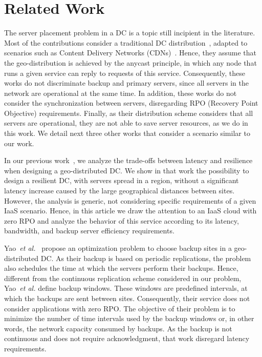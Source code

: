 \documentclass[preprint]{elsarticle}
\begin{document}
\section{Related Work}
\label{zeroRPO:secRelacionados}

The server placement problem in a DC is a topic still incipient in the literature. Most of the contributions consider a traditional DC distribution~\cite{habib2012design,xiaoJoint2014,develder2011survivable,develder2012resilient,xiao2013Data}, adapted to scenarios such as Content Delivery Networks (CDNs)~\cite{pierre2006Globule}. Hence, they assume that the geo-distribution is achieved by the anycast principle, in which any node that runs a given service can reply to requests of this service. Consequently, these works do not discriminate backup and primary servers, since all servers in the network are operational at the same time.
In addition, these works do not consider the synchronization between servers, disregarding RPO (Recovery Point Objective) requirements. Finally, as their distribution scheme considers that all servers are operational,
they are not able to save server resources, as we do in this work. We detail next three other works that consider a scenario similar to our work.

In our previous work~\cite{couto2014Latency}, we analyze the trade-offs between latency and resilience when designing a geo-distributed DC. We show in that work the possibility to design a resilient DC, with servers spread in a region, without a significant latency increase caused by the large geographical distances between sites. However, the analysis is generic, not considering specific requirements of a given IaaS scenario. Hence, in this article we draw the attention to an IaaS cloud with zero RPO and analyze the behavior of this service according to its latency, bandwidth, and backup server efficiency requirements.

Yao~\textit{et al.}~\cite{yao2014minimizing} propose an optimization problem to choose backup sites in a geo-distributed DC. As their backup is based on periodic replications, the problem also schedules the time at which the servers perform their backups.
Hence, different from the continuous replication scheme considered in our problem, Yao~\textit{et al.} define backup windows. These windows are predefined intervals, at which the backups are sent between sites. Consequently, their service does not consider applications with zero RPO. The objective of their problem is to minimize the number of time intervals used by the backup windows or, in other words, the network capacity consumed by backups. As the backup is not continuous and does not require acknowledgment, that work disregard latency requirements.
\end{document}
